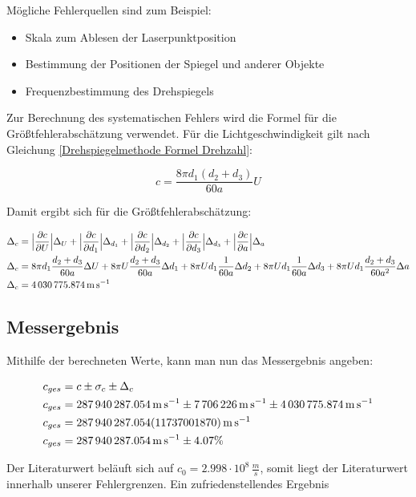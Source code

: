 Mögliche Fehlerquellen sind zum Beispiel:
\begin{itemize}
    \item Skala zum Ablesen der Laserpunktposition
    \item Bestimmung der Positionen der Spiegel und anderer Objekte
    \item Frequenzbestimmung des Drehspiegels
\end{itemize}

Zur Berechnung des systematischen Fehlers wird die Formel für die Größtfehlerabschätzung verwendet. Für die Lichtgeschwindigkeit gilt nach Gleichung \ref{Drehspiegelmethode Formel Drehzahl}:

\begin{equation}
    c = \frac{8 \pi  d_1 (d_2 + d_3)}{60a} U
\end{equation}

Damit ergibt sich für die Größtfehlerabschätzung:

\begin{align}
    \Delta_c &= \Bigl| \frac{\partial c}{\partial U} \Bigl| \Delta_U + \Bigl|
    \frac{\partial c}{\partial d_1} \Bigl| \Delta_{d_1} + \Bigl| \frac{\partial
    c}{\partial d_2} \Bigl| \Delta_{d_2} + \Bigl| \frac{\partial c}{\partial d_3}
    \Bigl| \Delta_{d_3} + \Bigl| \frac{\partial c}{\partial a} \Bigl| \Delta_a \\
    \Delta_c &= 8 \pi d_1 \frac{d_2 + d_3}{60a}\Delta U + 8 \pi U \frac{d_2 + d_3}{60a}\Delta d_1 + 8 \pi U d_1 \frac{1}{60a} \Delta d_2 + 8 \pi U d_1 \frac{1}{60a} \Delta d_3 + 8 \pi U d_1 \frac{d_2 + d_3 }{60a^2} \Delta a \\
    \Delta_c &= \SI{4030775.874}{\metre\per\second}
\end{align}

\subsection{Messergebnis}

Mithilfe der berechneten Werte, kann man nun das Messergebnis angeben:

\begin{align}
    c_{ges} &= c \pm \sigma_c \pm \Delta_c \\
    c_{ges} &= \SI{287940287.054}{\metre\per\second} \pm \SI{7706226}{\metre\per\second} \pm  \SI{4030775.874}{\metre\per\second}\\
    c_{ges} &= \SI{287940287.054 \pm 11737001.87}{\metre\per\second} \\
     c_{ges} &= \SI{287940287.054}{\metre\per\second} \pm 4.07 \%
\end{align}

Der Literaturwert beläuft sich auf $c_0 = 2.998 \cdot 10^8 \, \frac{m}{s}$, somit liegt der Literaturwert innerhalb unserer Fehlergrenzen.
Ein zufriedenstellendes Ergebnis